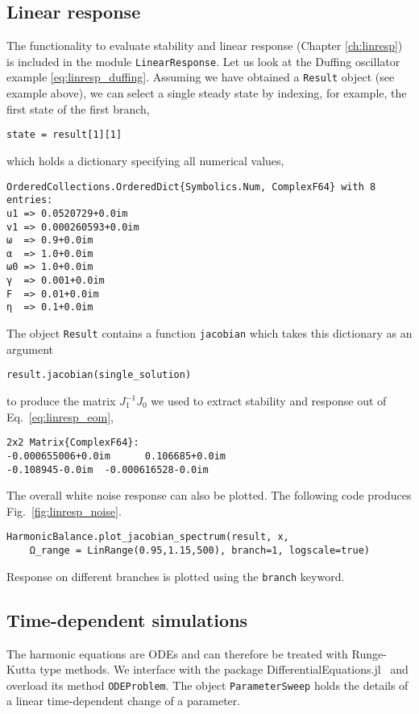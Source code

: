 \subsection{Linear response}
The functionality to evaluate stability and linear response (Chapter \ref{ch:linresp}) is included in the module \texttt{LinearResponse}. Let us look at the Duffing oscillator example \eqref{eq:linresp_duffing}. Assuming we have obtained a \texttt{Result} object (see example above), we can select a single steady state by indexing, for example, the first state of the first branch,
\begin{lstlisting}[numbers=none]
state = result[1][1]
\end{lstlisting}
which holds a dictionary specifying all numerical values,
\begin{lstlisting}[numbers=none, basicstyle=\scriptsize\ttfamily]
OrderedCollections.OrderedDict{Symbolics.Num, ComplexF64} with 8 entries:
u1 => 0.0520729+0.0im
v1 => 0.000260593+0.0im
ω  => 0.9+0.0im
α  => 1.0+0.0im
ω0 => 1.0+0.0im
γ  => 0.001+0.0im
F  => 0.01+0.0im
η  => 0.1+0.0im
\end{lstlisting}
The object \texttt{Result} contains a function \texttt{jacobian} which takes this dictionary as an argument
\begin{lstlisting}[numbers=none]
result.jacobian(single_solution)
\end{lstlisting}
to produce the matrix $J_1^{-1} J_0$ we used to extract stability and response out of Eq.~\eqref{eq:linresp_eom},
\begin{lstlisting}[numbers=none, extendedchars=true, basicstyle=\scriptsize\ttfamily]
2x2 Matrix{ComplexF64}:
-0.000655006+0.0im      0.106685+0.0im
-0.108945-0.0im  -0.000616528-0.0im
\end{lstlisting}
The overall white noise response can also be plotted. The following code produces Fig.~\ref{fig:linresp_noise}. 
\begin{lstlisting}[numbers=none]
HarmonicBalance.plot_jacobian_spectrum(result, x, 
	Ω_range = LinRange(0.95,1.15,500), branch=1, logscale=true)
\end{lstlisting}
Response on different branches is plotted using the \texttt{branch} keyword. 

\subsection{Time-dependent simulations} 

The harmonic equations are ODEs and can therefore be treated with Runge-Kutta type methods. We interface with the package DifferentialEquations.jl~\cite{Rackauskas_2017} and overload its method \texttt{ODEProblem}. The object \texttt{ParameterSweep} holds the details of a linear time-dependent change of a parameter.

